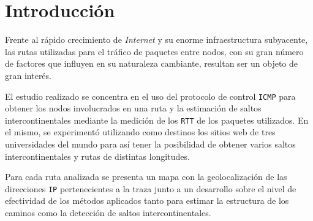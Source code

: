 \section{Introducción}

Frente al rápido crecimiento de \emph{Internet} y su enorme infraestructura
subyacente, las rutas utilizadas para el tráfico de paquetes entre nodos, con su
gran número de factores que influyen en su naturaleza cambiante, resultan ser un
objeto de gran interés.

El estudio realizado se concentra en el uso del protocolo de control
\texttt{ICMP} para obtener los nodos involucrados en una ruta y la estimación de
saltos intercontinentales mediante la medición de los \texttt{RTT} de los
paquetes utilizados. En el mismo, se experimentó utilizando como destinos los
sitios web de tres universidades del mundo para así tener la posibilidad de
obtener varios saltos intercontinentales y rutas de distintas longitudes.

Para cada ruta analizada se presenta un mapa con la geolocalización de las
direcciones \texttt{IP} pertenecientes a la traza junto a un desarrollo sobre el
nivel de efectividad de los métodos aplicados tanto para estimar la estructura
de los caminos como la detección de saltos intercontinentales.
